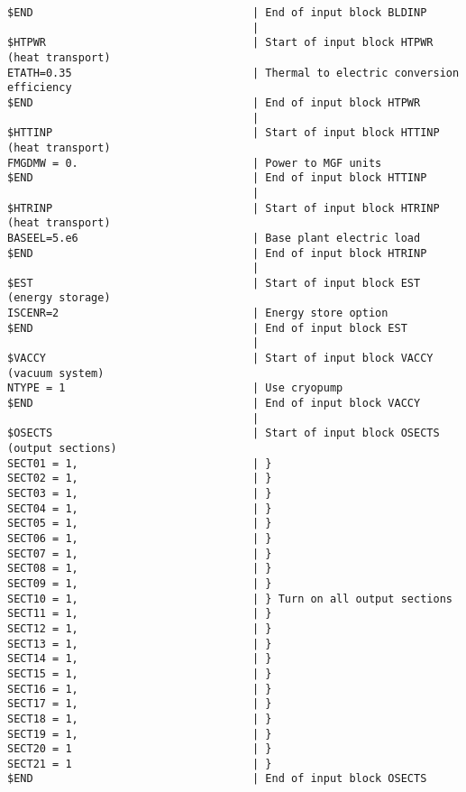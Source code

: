 \begin{verbatim}
$END                                  | End of input block BLDINP
                                      | 
$HTPWR                                | Start of input block HTPWR (heat transport)
ETATH=0.35                            | Thermal to electric conversion efficiency
$END                                  | End of input block HTPWR
                                      | 
$HTTINP                               | Start of input block HTTINP (heat transport)
FMGDMW = 0.                           | Power to MGF units
$END                                  | End of input block HTTINP
                                      | 
$HTRINP                               | Start of input block HTRINP (heat transport)
BASEEL=5.e6                           | Base plant electric load
$END                                  | End of input block HTRINP
                                      | 
$EST                                  | Start of input block EST (energy storage)
ISCENR=2                              | Energy store option
$END                                  | End of input block EST
                                      | 
$VACCY                                | Start of input block VACCY (vacuum system)
NTYPE = 1                             | Use cryopump
$END                                  | End of input block VACCY
                                      | 
$OSECTS                               | Start of input block OSECTS (output sections)
SECT01 = 1,                           | }
SECT02 = 1,                           | }
SECT03 = 1,                           | }
SECT04 = 1,                           | }
SECT05 = 1,                           | }
SECT06 = 1,                           | }
SECT07 = 1,                           | }
SECT08 = 1,                           | }
SECT09 = 1,                           | }
SECT10 = 1,                           | } Turn on all output sections
SECT11 = 1,                           | }
SECT12 = 1,                           | }
SECT13 = 1,                           | }
SECT14 = 1,                           | }
SECT15 = 1,                           | }
SECT16 = 1,                           | }
SECT17 = 1,                           | }
SECT18 = 1,                           | }
SECT19 = 1,                           | }
SECT20 = 1                            | }
SECT21 = 1                            | }
$END                                  | End of input block OSECTS
\end{verbatim}
\normalsize
